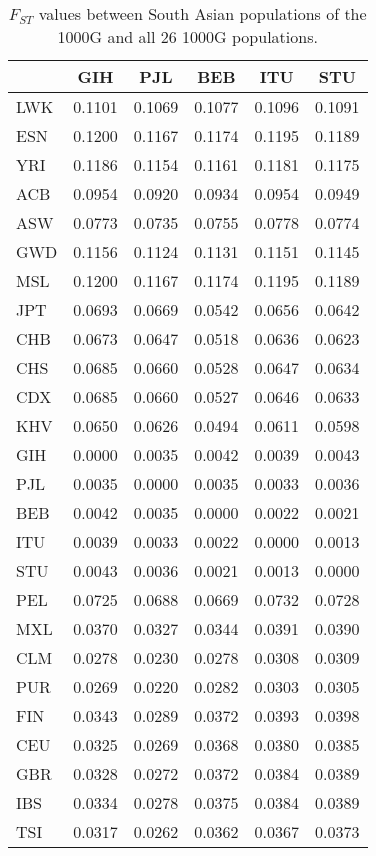 \begin{table}[ht]
\centering
\caption{$F_{ST}$ values between South Asian populations of the 1000G and all 26 1000G populations.} 
\label{tab:fst-SAS}
\begin{tabular}{|l|c|c|c|c|c|}
  \hline
 & GIH & PJL & BEB & ITU & STU \\ 
  \hline
LWK & 0.1101 & 0.1069 & 0.1077 & 0.1096 & 0.1091 \\ 
  ESN & 0.1200 & 0.1167 & 0.1174 & 0.1195 & 0.1189 \\ 
  YRI & 0.1186 & 0.1154 & 0.1161 & 0.1181 & 0.1175 \\ 
  ACB & 0.0954 & 0.0920 & 0.0934 & 0.0954 & 0.0949 \\ 
  ASW & 0.0773 & 0.0735 & 0.0755 & 0.0778 & 0.0774 \\ 
  GWD & 0.1156 & 0.1124 & 0.1131 & 0.1151 & 0.1145 \\ 
  MSL & 0.1200 & 0.1167 & 0.1174 & 0.1195 & 0.1189 \\ 
   \hline
JPT & 0.0693 & 0.0669 & 0.0542 & 0.0656 & 0.0642 \\ 
  CHB & 0.0673 & 0.0647 & 0.0518 & 0.0636 & 0.0623 \\ 
  CHS & 0.0685 & 0.0660 & 0.0528 & 0.0647 & 0.0634 \\ 
  CDX & 0.0685 & 0.0660 & 0.0527 & 0.0646 & 0.0633 \\ 
  KHV & 0.0650 & 0.0626 & 0.0494 & 0.0611 & 0.0598 \\ 
   \hline
GIH & 0.0000 & 0.0035 & 0.0042 & 0.0039 & 0.0043 \\ 
  PJL & 0.0035 & 0.0000 & 0.0035 & 0.0033 & 0.0036 \\ 
  BEB & 0.0042 & 0.0035 & 0.0000 & 0.0022 & 0.0021 \\ 
  ITU & 0.0039 & 0.0033 & 0.0022 & 0.0000 & 0.0013 \\ 
  STU & 0.0043 & 0.0036 & 0.0021 & 0.0013 & 0.0000 \\ 
   \hline
PEL & 0.0725 & 0.0688 & 0.0669 & 0.0732 & 0.0728 \\ 
  MXL & 0.0370 & 0.0327 & 0.0344 & 0.0391 & 0.0390 \\ 
  CLM & 0.0278 & 0.0230 & 0.0278 & 0.0308 & 0.0309 \\ 
  PUR & 0.0269 & 0.0220 & 0.0282 & 0.0303 & 0.0305 \\ 
   \hline
FIN & 0.0343 & 0.0289 & 0.0372 & 0.0393 & 0.0398 \\ 
  CEU & 0.0325 & 0.0269 & 0.0368 & 0.0380 & 0.0385 \\ 
  GBR & 0.0328 & 0.0272 & 0.0372 & 0.0384 & 0.0389 \\ 
  IBS & 0.0334 & 0.0278 & 0.0375 & 0.0384 & 0.0389 \\ 
  TSI & 0.0317 & 0.0262 & 0.0362 & 0.0367 & 0.0373 \\ 
   \hline
\end{tabular}
\end{table}
